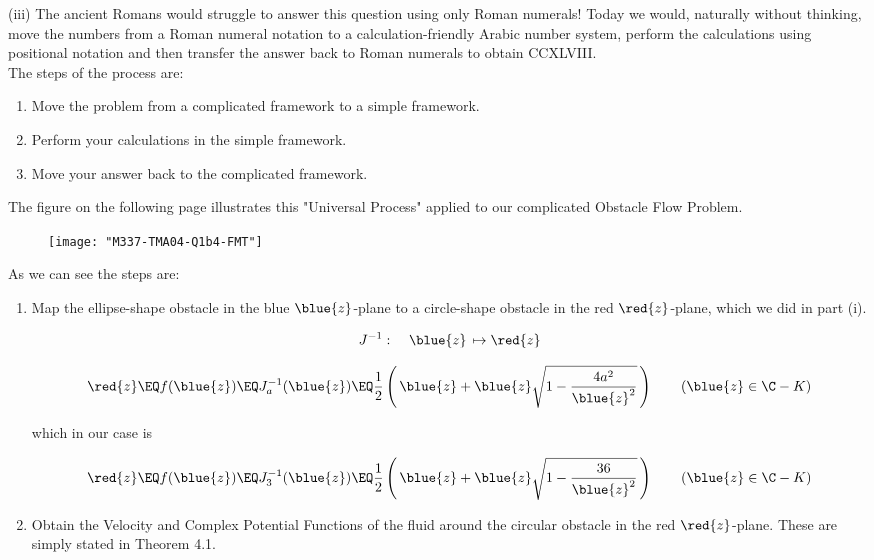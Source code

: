 \documentclass[english,a4paper,11pt]{scrartcl}
\begin{document}
\begin{labeling}{(iii) }
\bigskip
The ancient Romans would struggle to answer this question using only Roman numerals! Today we would, naturally without thinking, move the numbers from a Roman numeral notation to a calculation-friendly Arabic number system, perform the calculations using positional notation and then transfer the answer back to Roman numerals to obtain CCXLVIII. \\ 

\bigskip
The steps of the process are:
\begin{enumerate}
\item Move the problem from a complicated framework to a simple framework.
\item Perform your calculations in the simple framework. 
\item Move your answer back to the complicated framework. 
\end{enumerate}

\bigskip
The figure on the following page illustrates this "Universal Process" applied to our complicated Obstacle Flow Problem. \\

\newpage
\begin{figure}[H]
  	\centering
  	\texttt{[image: "M337-TMA04-Q1b4-FMT"]}
  \end{figure}  
  
As we can see the steps are:\\

\begin{enumerate}
\item Map the ellipse-shape obstacle in the blue $\blue{z}$-plane to a circle-shape obstacle in the red $\red{z}$-plane, which we did in part (i).

\[ J^{-1} \, \colon  \quad  \blue{z} \, \mapsto \red{z}  \]

\[ \red{z} \EQ  f(\blue{z}) \EQ J_a^{-1}(\blue{z}) \EQ  \frac1{2} \left(\, \blue{z} + \blue{z} \sqrt{1 - \frac{4a^2}{\blue{z}^2}} \,\right)  \qquad (\blue{z} \in \C - K) \]

which in our case is

\[ \red{z} \EQ  f(\blue{z}) \EQ J_3^{-1}(\blue{z})  \EQ \frac1{2} \left(\, \blue{z} + \blue{z} \sqrt{1 - \frac{36}{\blue{z}^2}} \,\right)  \qquad (\blue{z} \in \C - K) \]

\newpage
\item Obtain the Velocity and Complex Potential Functions of the fluid around the circular obstacle in the red $\red{z}$-plane. These are simply stated in Theorem 4.1.


\end{enumerate}
\end{labeling}
\end{document}
